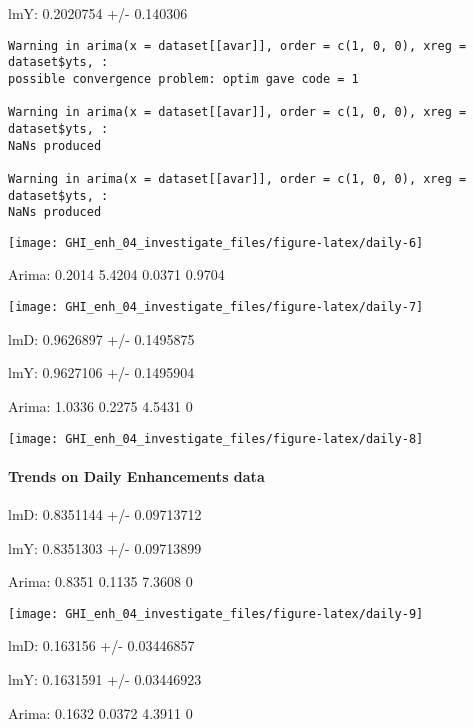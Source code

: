 \documentclass[
  10pt,
  a4paper,oneside]{article}
\begin{document}
lmY: 0.2020754 +/- 0.140306

\begin{verbatim}
Warning in arima(x = dataset[[avar]], order = c(1, 0, 0), xreg = dataset$yts, :
possible convergence problem: optim gave code = 1

Warning in arima(x = dataset[[avar]], order = c(1, 0, 0), xreg = dataset$yts, :
NaNs produced

Warning in arima(x = dataset[[avar]], order = c(1, 0, 0), xreg = dataset$yts, :
NaNs produced
\end{verbatim}

\begin{center}\texttt{[image: GHI\_enh\_04\_investigate\_files/figure-latex/daily-6]} \end{center}

Arima: 0.2014 5.4204 0.0371 0.9704

\begin{center}\texttt{[image: GHI\_enh\_04\_investigate\_files/figure-latex/daily-7]} \end{center}

lmD: 0.9626897 +/- 0.1495875

lmY: 0.9627106 +/- 0.1495904

Arima: 1.0336 0.2275 4.5431 0

\begin{center}\texttt{[image: GHI\_enh\_04\_investigate\_files/figure-latex/daily-8]} \end{center}

\newpage

\hypertarget{trends-on-daily-enhancements-data}{%
\paragraph{Trends on Daily Enhancements data}\label{trends-on-daily-enhancements-data}}

lmD: 0.8351144 +/- 0.09713712

lmY: 0.8351303 +/- 0.09713899

Arima: 0.8351 0.1135 7.3608 0

\begin{center}\texttt{[image: GHI\_enh\_04\_investigate\_files/figure-latex/daily-9]} \end{center}

lmD: 0.163156 +/- 0.03446857

lmY: 0.1631591 +/- 0.03446923

Arima: 0.1632 0.0372 4.3911 0
\end{document}
